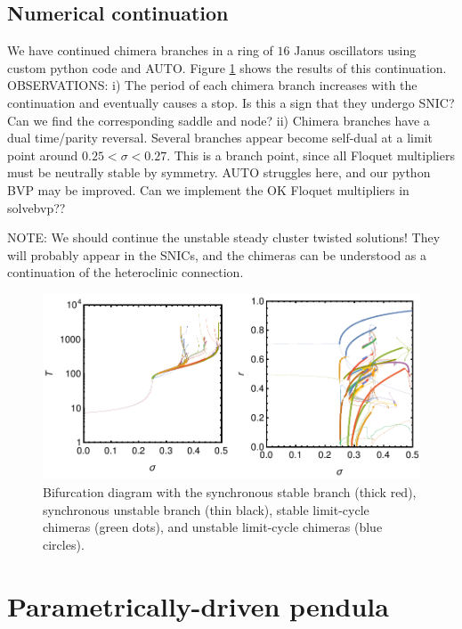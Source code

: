 \documentclass[aps,pre,amsmath,amssymb,floatfix,onecolumn,notitlepage,10pt]{revtex4-1}
\begin{document}
\subsection{Numerical continuation}
We have continued chimera branches in a ring of $16$ Janus oscillators using custom python code and AUTO. Figure \ref{fig1} shows the results of this continuation. OBSERVATIONS: i) The period of each chimera branch increases with the continuation and eventually causes a stop. Is this a sign that they undergo SNIC? Can we find the corresponding saddle and node? ii) Chimera branches have a dual time/parity reversal. Several branches appear become self-dual at a limit point around $0.25<\sigma<0.27$. This is a branch point, since all Floquet multipliers must be neutrally stable by symmetry. AUTO struggles here, and our python BVP may be improved. Can we implement the OK Floquet multipliers in solvebvp??

NOTE: We should continue the unstable steady cluster twisted solutions! They will probably appear in the SNICs, and the chimeras can be understood as a continuation of the heteroclinic connection.

\begin{figure}[hb]
\includegraphics[width=\columnwidth]{diagram.pdf}
\caption{Bifurcation diagram with the synchronous stable branch (thick red), synchronous unstable branch (thin black), stable limit-cycle chimeras (green dots), and unstable limit-cycle chimeras (blue circles). \label{fig1}}
\end{figure}


\section{Parametrically-driven pendula}
\end{document}
